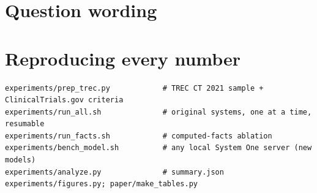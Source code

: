 \documentclass[11pt]{article}
\begin{document}
\section{Question wording}
\label{app:questions}


\section{Reproducing every number}
\begin{lstlisting}
experiments/prep_trec.py            # TREC CT 2021 sample + ClinicalTrials.gov criteria
experiments/run_all.sh              # original systems, one at a time, resumable
experiments/run_facts.sh            # computed-facts ablation
experiments/bench_model.sh          # any local System One server (new models)
experiments/analyze.py              # summary.json
experiments/figures.py; paper/make_tables.py
\end{lstlisting}
\end{document}
